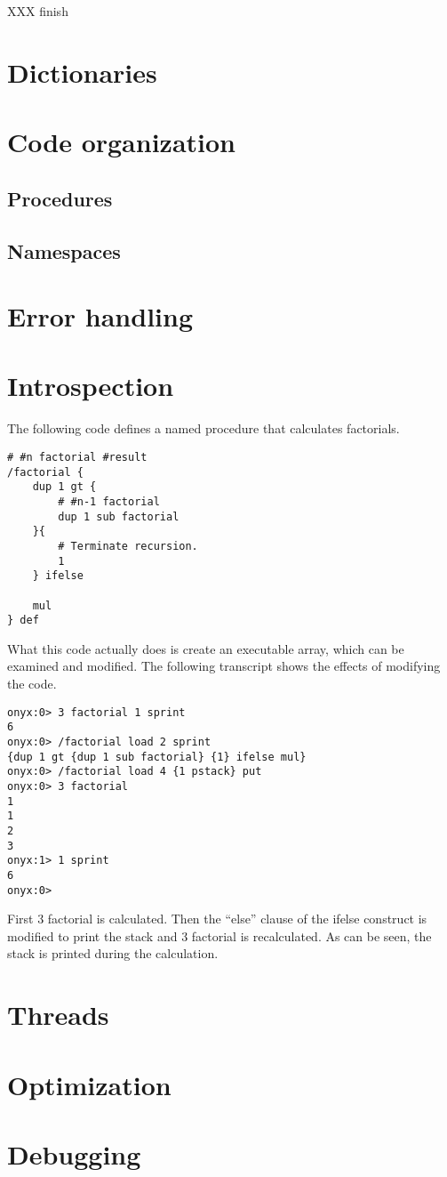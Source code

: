 XXX finish

\section{Dictionaries}

\section{Code organization}
\subsection{Procedures}
\subsection{Namespaces}

\section{Error handling}

\section{Introspection}
\label{onyxtut:introspection}

The following code defines a named procedure that calculates factorials.

\begin{verbatim}
# #n factorial #result
/factorial {
    dup 1 gt {
        # #n-1 factorial
        dup 1 sub factorial
    }{
        # Terminate recursion.
        1
    } ifelse

    mul
} def
\end{verbatim}

What this code actually does is create an executable array, which can be
examined and modified.  The following transcript shows the effects of modifying
the code.

\begin{verbatim}
onyx:0> 3 factorial 1 sprint
6
onyx:0> /factorial load 2 sprint
{dup 1 gt {dup 1 sub factorial} {1} ifelse mul}
onyx:0> /factorial load 4 {1 pstack} put
onyx:0> 3 factorial 
1
1
2
3
onyx:1> 1 sprint
6
onyx:0>
\end{verbatim}

First 3 factorial is calculated.  Then the ``else'' clause of the ifelse
construct is modified to print the stack and 3 factorial is recalculated.  As
can be seen, the stack is printed during the calculation.

\section{Threads}

\section{Optimization}

\section{Debugging}
